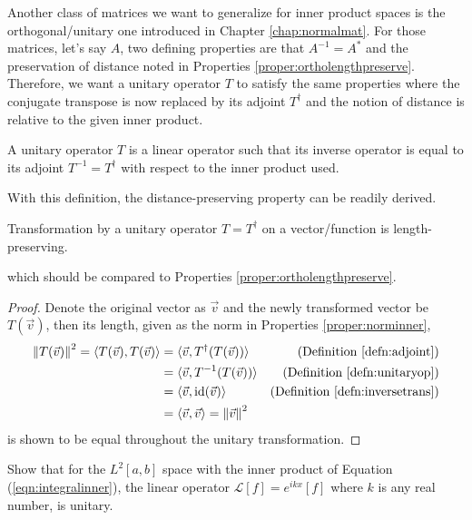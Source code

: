 Another class of matrices we want to generalize for inner product spaces is the orthogonal/unitary one introduced in Chapter \ref{chap:normalmat}. For those matrices, let's say $A$, two defining properties are that $A^{-1} = A^*$ and the preservation of distance noted in Properties \ref{proper:ortholengthpreserve}. Therefore, we want a unitary operator $T$ to satisfy the same properties where the conjugate transpose is now replaced by its adjoint $T^\dag$ and the notion of distance is relative to the given inner product.
\begin{defn}
\label{defn:unitaryop}
A unitary operator $T$ is a linear operator such that its inverse operator is equal to its adjoint $T^{-1} = T^\dag$ with respect to the inner product used.
\end{defn}
With this definition, the distance-preserving property can be readily derived.
\begin{proper}
Transformation by a unitary operator $T = T^\dag$ on a vector/function is length-preserving.
\end{proper}
which should be compared to Properties \ref{proper:ortholengthpreserve}.
\begin{proof}
Denote the original vector as $\vec{v}$ and the newly transformed vector be $T(\vec{v})$, then its length, given as the norm in Properties \ref{proper:norminner},
\begin{align*}
\norm{T(\vec{v})}^2 = \langle T(\vec{v}), T(\vec{v}) \rangle &= \langle \vec{v}, T^\dag(T(\vec{v})) \rangle & \text{(Definition \ref{defn:adjoint})} \\
&= \langle \vec{v}, T^{-1}(T(\vec{v})) \rangle & \text{(Definition \ref{defn:unitaryop})} \\
&= \langle \vec{v}, \text{id}(\vec{v}) \rangle & \text{(Definition \ref{defn:inversetrans})} \\
&= \langle \vec{v}, \vec{v} \rangle = \norm{\vec{v}}^2
\end{align*}
is shown to be equal throughout the unitary transformation.
\end{proof}
\begin{exmp}
Show that for the $L^2[a,b]$ space with the inner product of Equation (\ref{eqn:integralinner}), the linear operator $\mathcal{L}[f] = e^{ikx}[f]$ where $k$ is any real number, is unitary.
\end{exmp}
